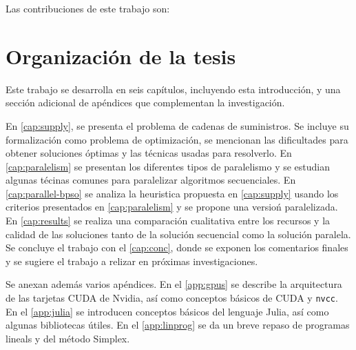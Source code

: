 Las contribuciones de este trabajo son:

\section {Organización de la tesis}

Este trabajo se desarrolla en seis capítulos, incluyendo esta introducción, y
una sección adicional de apéndices que complementan la investigación.

En \cref{cap:supply}, se presenta el problema de cadenas de suministros. Se
incluye su formalización como problema de optimización, se mencionan las
dificultades para obtener soluciones óptimas y las técnicas usadas para
resolverlo. En \cref{cap:paralelism} se presentan los diferentes tipos de
paralelismo y se estudian algunas técinas comunes para paralelizar algoritmos
secuenciales. En \cref{cap:parallel-bpso} se analiza la heuristica propuesta en
\cref{cap:supply} usando los criterios presentados en \cref{cap:paralelism} y
se propone una versioń paralelizada. En \cref{cap:results} se realiza una
comparación cualitativa entre los recursos y la calidad de las soluciones tanto
de la solución secuencial como la solución paralela. Se concluye el trabajo con
el \cref{cap:conc}, donde se exponen los comentarios finales y se sugiere el
trabajo a relizar en próximas investigaciones.

Se anexan además varios apéndices. En el \cref{app:gpus} se describe la
arquitectura de las tarjetas CUDA de Nvidia, así como conceptos básicos de
CUDA y \texttt{nvcc}. En el \cref{app:julia} se introducen conceptos básicos
del lenguaje Julia, así como algunas bibliotecas útiles. En el \cref{app:linprog}
se da un breve repaso de programas lineals y del método Simplex.
